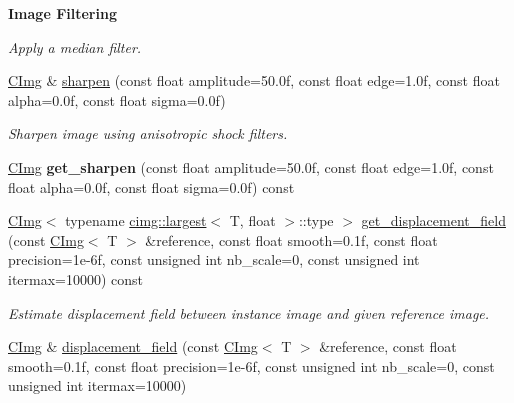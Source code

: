 \begin{Indent}{\bf Image Filtering}
\begin{DoxyCompactItemize}
\begin{DoxyCompactList}\small\item\em Apply a median filter. \item\end{DoxyCompactList}\item 
\hypertarget{structcimg__library_1_1_c_img_a082215bbfbfef39b22ec607df8e0f482}{
\hyperlink{structcimg__library_1_1_c_img}{CImg} \& \hyperlink{structcimg__library_1_1_c_img_a082215bbfbfef39b22ec607df8e0f482}{sharpen} (const float amplitude=50.0f, const float edge=1.0f, const float alpha=0.0f, const float sigma=0.0f)}
\label{structcimg__library_1_1_c_img_a082215bbfbfef39b22ec607df8e0f482}

\begin{DoxyCompactList}\small\item\em Sharpen image using anisotropic shock filters. \item\end{DoxyCompactList}\item 
\hypertarget{structcimg__library_1_1_c_img_ad55e9b1d363edbf22626437d9d8f6733}{
\hyperlink{structcimg__library_1_1_c_img}{CImg} {\bfseries get\_\-sharpen} (const float amplitude=50.0f, const float edge=1.0f, const float alpha=0.0f, const float sigma=0.0f) const }
\label{structcimg__library_1_1_c_img_ad55e9b1d363edbf22626437d9d8f6733}

\item 
\hypertarget{structcimg__library_1_1_c_img_a39897fc61dd34f2b4287ee24a7c9559b}{
\hyperlink{structcimg__library_1_1_c_img}{CImg}$<$ typename \hyperlink{structcimg__library_1_1cimg_1_1largest}{cimg::largest}$<$ T, float $>$::type $>$ \hyperlink{structcimg__library_1_1_c_img_a39897fc61dd34f2b4287ee24a7c9559b}{get\_\-displacement\_\-field} (const \hyperlink{structcimg__library_1_1_c_img}{CImg}$<$ T $>$ \&reference, const float smooth=0.1f, const float precision=1e-\/6f, const unsigned int nb\_\-scale=0, const unsigned int itermax=10000) const }
\label{structcimg__library_1_1_c_img_a39897fc61dd34f2b4287ee24a7c9559b}

\begin{DoxyCompactList}\small\item\em Estimate displacement field between instance image and given reference image. \item\end{DoxyCompactList}\item 
\hypertarget{structcimg__library_1_1_c_img_a3e393fd1f7b42451f4bb1ade1bcabddc}{
\hyperlink{structcimg__library_1_1_c_img}{CImg} \& \hyperlink{structcimg__library_1_1_c_img_a3e393fd1f7b42451f4bb1ade1bcabddc}{displacement\_\-field} (const \hyperlink{structcimg__library_1_1_c_img}{CImg}$<$ T $>$ \&reference, const float smooth=0.1f, const float precision=1e-\/6f, const unsigned int nb\_\-scale=0, const unsigned int itermax=10000)}
\label{structcimg__library_1_1_c_img_a3e393fd1f7b42451f4bb1ade1bcabddc}


\end{DoxyCompactItemize}
\end{Indent}
